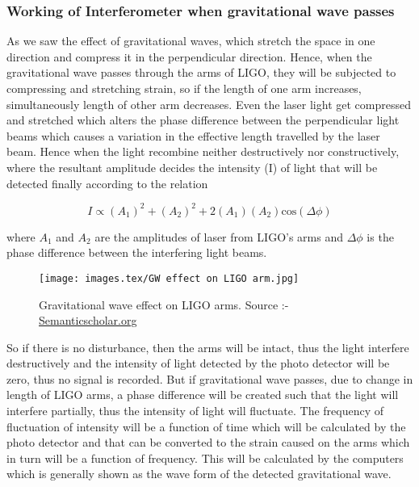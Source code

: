 \subsubsection{Working of Interferometer when gravitational wave passes}

As we saw the effect of gravitational waves, which stretch the space in one direction and compress it in the perpendicular direction. Hence, when the gravitational wave passes through the arms of LIGO, they will be subjected to compressing and stretching strain, so if the length of one arm increases, simultaneously length of other arm decreases. Even the laser light get compressed and stretched which alters the phase difference between the perpendicular light beams which causes a variation in the effective length travelled by the laser beam. Hence when the light recombine neither destructively nor constructively, where the resultant amplitude decides the intensity (I) of light that will be detected finally according to the relation

\begin{equation}
     I \propto (A_1)^2 + (A_2)^2 + 2(A_1)(A_2)\text{cos}(\Delta \phi)
\end{equation}

where $A_1$ and $A_2$ are the amplitudes of laser from LIGO's arms and $\Delta \phi$ is the phase difference between the interfering light beams. 

\begin{figure}[h]
    \centering
    \texttt{[image: images.tex/GW effect on LIGO arm.jpg]}
    \caption{Gravitational wave effect on LIGO arms. Source :- \href{https://www.semanticscholar.org/paper/Broadband-Measurement-and-Reduction-of-Quantum-in-Cripe/ffe14b1a34d504599fa81c817bbb9aef5385c06c}{Semanticscholar.org} \cite{Cripe2020BroadbandMA}}
\end{figure}

So if there is no disturbance, then the arms will be intact, thus the light interfere destructively and the intensity of light detected by the photo detector will be zero, thus no signal is recorded. But if gravitational wave passes, due to change in length of LIGO arms, a phase difference will be created such that the light will interfere partially, thus the intensity of light will fluctuate. The frequency of fluctuation of intensity will be a function of time which will be calculated by the photo detector and that can be converted to the strain caused on the arms which in turn will be a function of frequency. This will be calculated by the computers which is generally shown as the wave form of the detected gravitational wave. 

